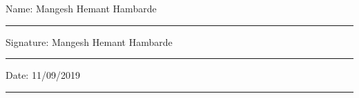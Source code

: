 \documentclass[12pt,oneside]{book}
\begin{document}
\noindent Name: Mangesh Hemant Hambarde\\[1mm]
\rule[1em]{25em}{0.5pt}

\noindent Signature: Mangesh Hemant Hambarde\\[1mm]
\rule[1em]{25em}{0.5pt}

\noindent Date: 11/09/2019\\[1mm]
\rule[1em]{25em}{0.5pt}





\tableofcontents
\listoffigures
\listoftables


\mainmatter










\end{document}
